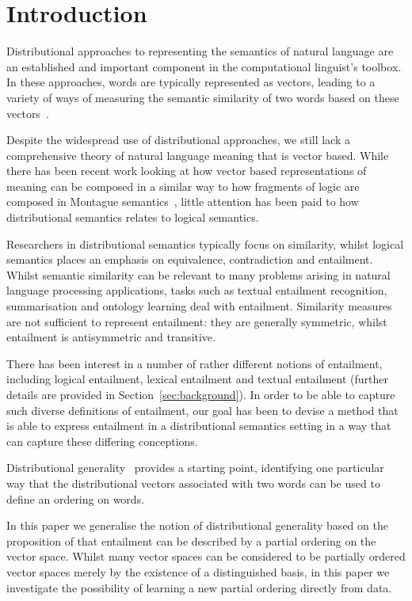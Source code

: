 \section{Introduction}

Distributional approaches to representing the semantics of natural language
are an established and important component in the computational
linguist's toolbox. In these approaches, words are typically
represented as vectors, leading to a variety of ways of measuring the semantic 
similarity of two words based on these vectors~\cite{Lee:99}. 

Despite the widespread use of distributional approaches, we still lack a comprehensive theory
of natural language meaning that is vector based. While there has been recent work  
looking at how vector based 
representations of meaning can be composed in a
similar way to how fragments of logic are composed in Montague 
semantics~\cite{Clark:08,Grefenstette:11},  
little attention has been paid to how 
distributional semantics relates to logical semantics. 

Researchers in distributional semantics typically focus
on similarity, whilst logical semantics places an emphasis on
equivalence, contradiction and entailment. Whilst semantic similarity can be
relevant to many problems arising in natural language processing applications, 
tasks such as textual entailment recognition, summarisation and ontology learning
deal with entailment. Similarity measures are not sufficient to
represent entailment: they are generally symmetric, whilst entailment
is antisymmetric and transitive.

There has been interest in a number of rather different notions of
entailment, including logical entailment, lexical entailment and
textual entailment (further details are provided in
Section~\ref{sec:background}). In order to be able to capture such
diverse definitions of entailment, our goal has been to devise a
method that is able to express entailment in a distributional
semantics setting in a way that can capture these differing
conceptions.

Distributional generality~\cite{Weeds:04} provides a starting point, identifying one particular way that the distributional vectors associated with two words can be used to define an ordering on words. 

In this paper we generalise the notion of distributional generality based on the proposition of  that
entailment can be described by a partial ordering on the vector
space. Whilst many vector spaces can be considered to be partially
ordered vector spaces merely by the existence of a distinguished
basis, in this paper we investigate the possibility of learning a new
partial ordering directly from data. 

